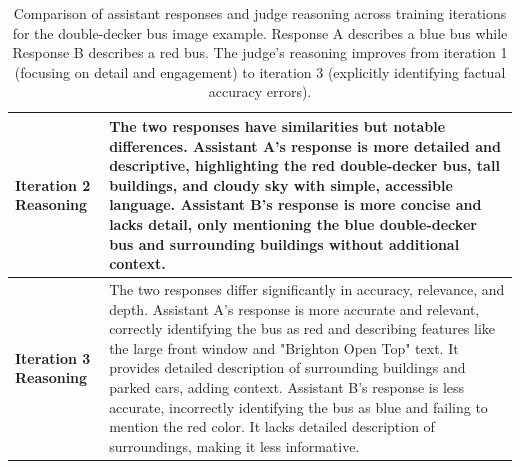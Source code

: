 \begin{table}[h!]
\begin{tabular}{>{\raggedright\arraybackslash}p{2.5cm}p{12cm}}
\midrule
\textbf{Iteration 2 Reasoning} & The two responses have similarities but notable differences. Assistant A's response is more detailed and descriptive, highlighting the red double-decker bus, tall buildings, and cloudy sky with simple, accessible language. Assistant B's response is more concise and lacks detail, only mentioning the blue double-decker bus and surrounding buildings without additional context. \\
\midrule
\textbf{Iteration 3 Reasoning} & The two responses differ significantly in accuracy, relevance, and depth. Assistant A's response is more accurate and relevant, correctly identifying the bus as red and describing features like the large front window and "Brighton Open Top" text. It provides detailed description of surrounding buildings and parked cars, adding context. Assistant B's response is less accurate, incorrectly identifying the bus as blue and failing to mention the red color. It lacks detailed description of surroundings, making it less informative. \\
\bottomrule
\end{tabular}
\caption{Comparison of assistant responses and judge reasoning across training iterations for the double-decker bus image example. Response A describes a blue bus while Response B describes a red bus. The judge's reasoning improves from iteration 1 (focusing on detail and engagement) to iteration 3 (explicitly identifying factual accuracy errors).}
\end{table}

\newpage

